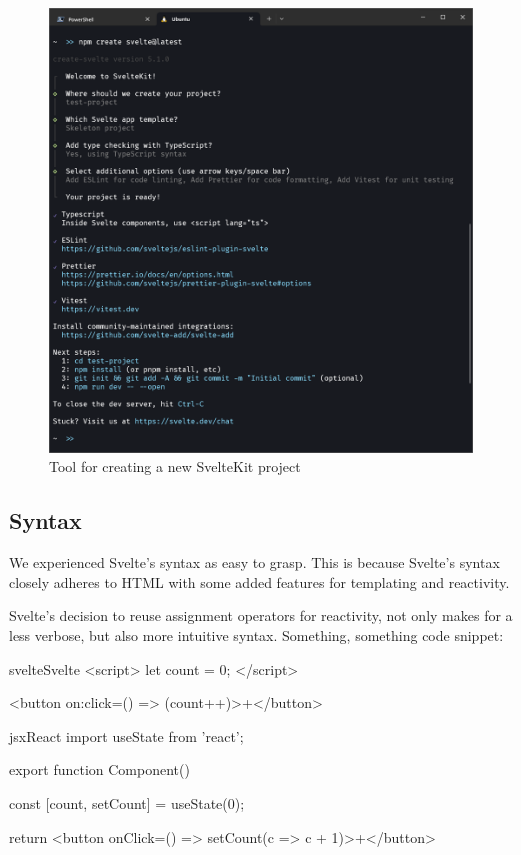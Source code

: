 \begin{figure}
    \centering
    \includegraphics[width=.95\linewidth,trim={0 15cm 0 1.5cm},clip]{assets/sveltekit-project-setup}
    \caption{Tool for creating a new SvelteKit project}
    \label{fig:project-setup}
\end{figure}

\subsection{Syntax}
We experienced Svelte's syntax as easy to grasp. This is because Svelte's syntax closely adheres to HTML with some added features for templating and reactivity.

Svelte's decision to reuse assignment operators for reactivity, not only makes for a less verbose, but also more intuitive syntax. Something, something code snippet:

\begin{myminted}{svelte}{Svelte}
<script>
    let count = 0;
</script>

<button on:click={() => (count++)}>+</button>
\end{myminted}

\begin{myminted}{jsx}{React}
import { useState } from 'react';

export function Component() {
    const [count, setCount] = useState(0);

    return <button onClick={() => setCount(c => c + 1)}>+</button>
}
\end{myminted}

